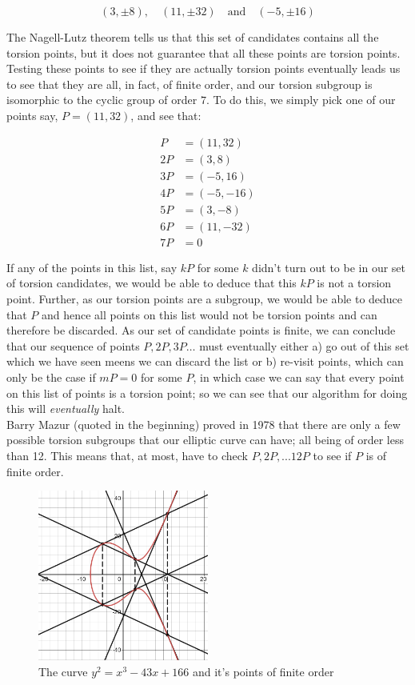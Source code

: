 \documentclass{article}
\begin{document}
\[(3, \pm 8), \quad (11, \pm 32) \quad \text{and} \quad (-5, \pm 16)\]

The Nagell-Lutz theorem tells us that this set of candidates contains all the torsion points, but it does not guarantee that all these points are torsion points. Testing these points to see if they are actually torsion points eventually leads us to see that they are all, in fact, of finite order, and our torsion subgroup is isomorphic to the cyclic group of order $7$. To do this, we simply pick one of our points say, $P = (11, 32)$, and see that:

\begin{align*} 
P &= (11, 32)\\
2P &= (3, 8)\\
3P &= (-5, 16)\\
4P &= (-5, -16)\\
5P &= (3, -8)\\
6P &= (11, -32)\\
7P &= 0
\end{align*} 

If any of the points in this list, say $kP$ for some $k$ didn't turn out to be in our set of torsion candidates, we would be able to deduce that this $kP$ is not a torsion point. Further, as our torsion points are a subgroup, we would be able to deduce that $P$ and hence all points on this list would not be torsion points and can therefore be discarded. As our set of candidate points is finite, we can conclude that our sequence of points $P, 2P, 3P \dots$ must eventually either a) go out of this set which we have seen meens we can discard the list or b) re-visit points, which can only be the case if $mP = 0$ for some $P$, in which case we can say that every point on this list of points is a torsion point; so we can see that our algorithm for doing this will \emph{eventually} halt.\\

Barry Mazur (quoted in the beginning) proved in 1978 that there are only a few possible torsion subgroups that our elliptic curve can have; all being of order less than 12. This means that, at most, have to check $P, 2P, ... 12P$ to see if $P$ is of finite order.


\begin{figure}
\centering
\includegraphics[width=0.5\textwidth]{desmos-graph (5).png}
\caption{\label{fig:into curve} The curve $y^2  = x^3 - 43 x + 166$ and it's points of finite order}
\end{figure}

\newpage



\end{document}
